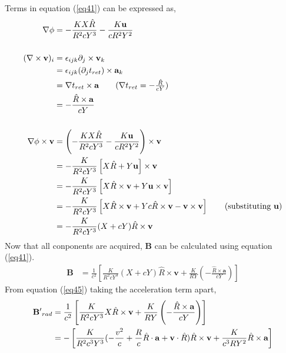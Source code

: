 \documentclass[11pt,a4paper]{article}
\begin{document}
Terms in equation (\ref{eq41}) can be expressed as,
\begin{align}
     \nabla \phi &= -\frac{KX\hat{R}}{R^2cY^3} - \frac{K\mathbf{u}}{cR^2Y^2} \\ \notag \\
     (\nabla \times \mathbf{v})_i &= \epsilon_{ijk} \partial_j \times \mathbf{v}_k  \notag \\
                                  &= \epsilon_{ijk} (\partial_j t_{ret}) \times \mathbf{a}_k  \notag \\
                                  &= \nabla t_{ret} \times \mathbf{a} \tag{$\nabla t_{ret} = -\frac{\hat{R}}{cY}$} \\
                                  &= -\frac{\hat{R}\times \mathbf{a}}{cY} \\ \notag \\
     \nabla \phi \times \mathbf{v} &= \left(-\frac{KX\hat{R}}{R^2cY^3} - \frac{K\mathbf{u}}{cR^2Y^2}\right) \times \mathbf{v} \notag \\
                                   &= -\frac{K}{R^2cY^3} \left[ X\hat{R} + Y\mathbf{u}\right] \times \mathbf{v} \notag \\
                                   &= -\frac{K}{R^2cY^3} \left[ X\hat{R} \times \mathbf{v} + Y\mathbf{u} \times \mathbf{v} \right] \notag \\
                                   &= -\frac{K}{R^2cY^3} \left[ X\hat{R} \times \mathbf{v} + Yc\hat{R} \times \mathbf{v} - \mathbf{v} \times \mathbf{v} \right] \tag{substituting $\mathbf{u}$} \\
                                   &= -\frac{K}{R^2cY^3} (X + cY) \hat{R} \times \mathbf{v} 
\end{align}
Now that all conponents are acquired, $\mathbf{B}$ can be calculated using equation (\ref{eq41}).
\begin{align}
    \mathbf{B} &= \frac{1}{c^2} \left[\frac{K}{R^2cY^3} (X + cY) \hat{R} \times \mathbf{v} + \frac{K}{RY}\left( -\frac{\hat{R} \times \mathbf{a}}{cY} \right) \right] \label{eq45}  
\end{align}
From equation (\ref{eq45}) taking the acceleration term apart,
\begin{align}
    \mathbf{B'}_{rad} &= \frac{1}{c^2}\left[\frac{K}{R^2cY^3} X \hat{R} \times \mathbf{v} + \frac{K}{RY}\left( -\frac{\hat{R} \times \mathbf{a}}{cY} \right) \right] \notag \\
                      &= -\left[\frac{K}{R^2c^3Y^3} (-\frac{v^2}{c} + \frac{R}{c}\hat{R}\cdot \mathbf{a} + \mathbf{v}\cdot \hat{R}) \hat{R} \times \mathbf{v} + \frac{K}{c^3RY^2} \hat{R} \times \mathbf{a} \right] \label{eq46}
\end{align}
\end{document}
